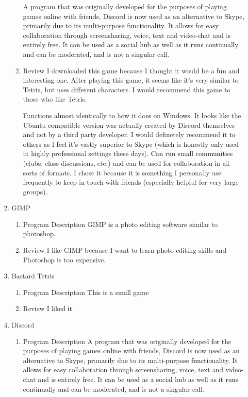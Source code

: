 \documentclass{article}
\begin{document}
\begin{enumerate}
\begin{enumerate}
A program that was originally developed for the purposes of playing games online with friends, Discord is now used as an alternative to Skype, primarily due to its multi-purpose functionality. It allows for easy collaboration through screensharing, voice, text and video-chat and is entirely free. It can be used as a social hub as well as it runs continually and can be moderated, and is not a singular call.
\item Review
\label{sec:org8d4f72a}
I downloaded this game because I thought it would be a fun and interesting one. After playing this game, it seems like it's very similar to Tetris, but uses different characters. I would recommend this game to those who like Tetris.  

Functions almost identically to how it does on Windows. It looks like the Ubuntu compatible version was actually created by Discord themselves and not by a third party developer. I would definetely recommend it to others as I feel it's vastly superior to Skype (which is honestly only used in highly professional settings these days). Can run small communities (clubs, class discussions, etc.) and can be used for collaboration in all sorts of formats. I chose it because it is something I personally use frequently to keep in touch with friends (especially helpful for very large groups).
\end{enumerate}
\item GIMP
\label{sec:orgf7bf1cd}
\begin{enumerate}
\item Program Description
\label{sec:org5fddf61}
GIMP is a photo editing software similar to photoshop.
\item Review
\label{sec:org8b1dcf0}
I like GIMP because I want to learn photo editing skills and Photoshop is too expensive.
\end{enumerate}
\item Bastard Tetris
\label{sec:org878d51d}
\begin{enumerate}
\item Program Description
\label{sec:org6543441}
This is a small game
\item Review
\label{sec:org264b84a}
I liked it
\end{enumerate}
\item Discord
\label{sec:org531013d}
\begin{enumerate}
\item Program Description
\label{sec:org1ca976a}
A program that was originally developed for the purposes of playing games online with friends, Discord is now used as an alternative to Skype, primarily due to its multi-purpose functionality. It allows for easy collaboration through screensharing, voice, text and video-chat and is entirely free. It can be used as a social hub as well as it runs continually and can be moderated, and is not a singular call.

\end{enumerate}
\end{enumerate}
\end{document}
